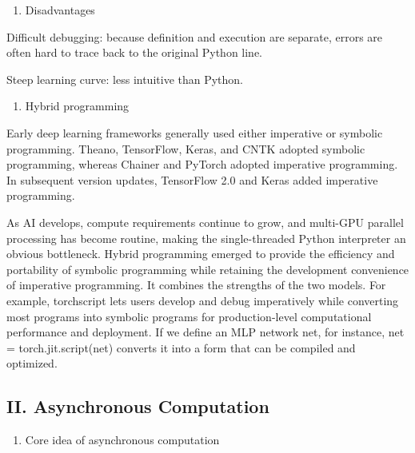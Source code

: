 \begin{enumerate}
\def\labelenumi{(\arabic{enumi})}
\setcounter{enumi}{2}
\tightlist
\item
  Disadvantages
\end{enumerate}

Difficult debugging: because definition and execution are separate, errors are often hard to trace back to the original Python line.

Steep learning curve: less intuitive than Python.

\begin{enumerate}
\def\labelenumi{\arabic{enumi}.}
\setcounter{enumi}{2}
\tightlist
\item
  Hybrid programming
\end{enumerate}

Early deep learning frameworks generally used either imperative or symbolic programming. Theano, TensorFlow, Keras, and CNTK adopted symbolic programming, whereas Chainer and PyTorch adopted imperative programming. In subsequent version updates, TensorFlow 2.0 and Keras added imperative programming.

As AI develops, compute requirements continue to grow, and multi-GPU parallel processing has become routine, making the single-threaded Python interpreter an obvious bottleneck. Hybrid programming emerged to provide the efficiency and portability of symbolic programming while retaining the development convenience of imperative programming. It combines the strengths of the two models. For example, torchscript lets users develop and debug imperatively while converting most programs into symbolic programs for production-level computational performance and deployment. If we define an MLP network net, for instance, net = torch.jit.script(net) converts it into a form that can be compiled and optimized.

\hypertarget{ii.-asynchronous-computation}{%
\subsection{II. Asynchronous Computation}\label{ii.-asynchronous-computation}}

\begin{enumerate}
\def\labelenumi{\arabic{enumi}.}
\tightlist
\item
  Core idea of asynchronous computation
\end{enumerate}

